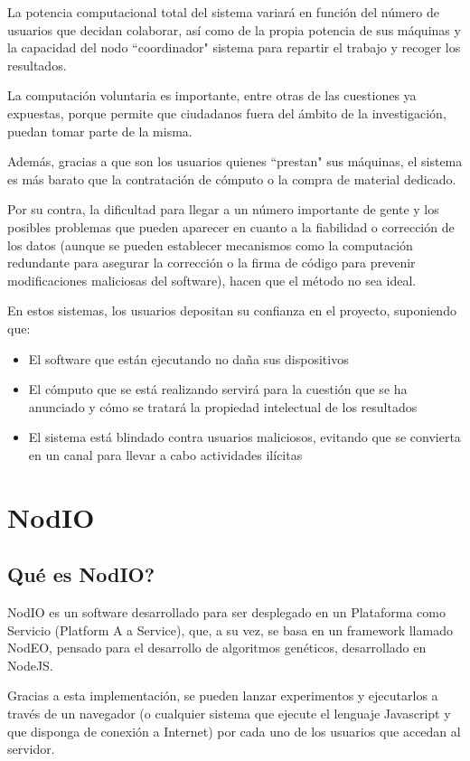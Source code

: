 \documentclass[runningheads,a4paper]{llncs}
\begin{document}
La potencia computacional total del sistema variar\'a en funci\'on del n\'umero de
usuarios que decidan colaborar, as\'i como de la propia potencia de sus m\'aquinas
y la capacidad del nodo ``coordinador" sistema para repartir el trabajo
y recoger los resultados.

La computaci\'on voluntaria es importante, entre otras de las cuestiones ya expuestas,
porque permite que ciudadanos fuera del \'ambito de la investigaci\'on, puedan
tomar parte de la misma.

Adem\'as, gracias a que son los usuarios quienes ``prestan" sus m\'aquinas, el sistema
es m\'as barato que la contrataci\'on de c\'omputo o la compra de material dedicado.

Por su contra, la dificultad para llegar a un n\'umero importante de gente y los posibles
problemas que pueden aparecer en cuanto a la fiabilidad o correcci\'on de los datos
(aunque se pueden establecer mecanismos como la computaci\'on redundante
para asegurar la correcci\'on o la firma de c\'odigo para prevenir modificaciones maliciosas
del software), hacen que el m\'etodo no sea ideal.

En estos sistemas, los usuarios depositan su confianza en el proyecto, suponiendo que:
\begin{itemize}
  \item El software que est\'an ejecutando no da\~na sus dispositivos
  \item El c\'omputo que se est\'a realizando servir\'a para la cuesti\'on que se
  ha anunciado y c\'omo se tratar\'a la propiedad intelectual de los resultados
  \item El sistema est\'a blindado contra usuarios maliciosos, evitando que
  se convierta en un canal para llevar a cabo actividades il\'icitas
\end{itemize}

\section{NodIO}
\subsection{\textquestiondown	Qu\'e es NodIO?}
NodIO \cite{nodio} es un software desarrollado para ser desplegado en un
Plataforma como Servicio (Platform A a Service), que, a su vez, se basa en un
framework llamado NodEO, pensado para el desarrollo de algoritmos gen\'eticos,
desarrollado en NodeJS.

Gracias a esta implementaci\'on, se pueden lanzar experimentos y ejecutarlos a
trav\'es de un navegador (o cualquier sistema que ejecute el lenguaje Javascript
y que disponga de conexi\'on a Internet)
por cada uno de los usuarios que accedan al servidor.
\end{document}
